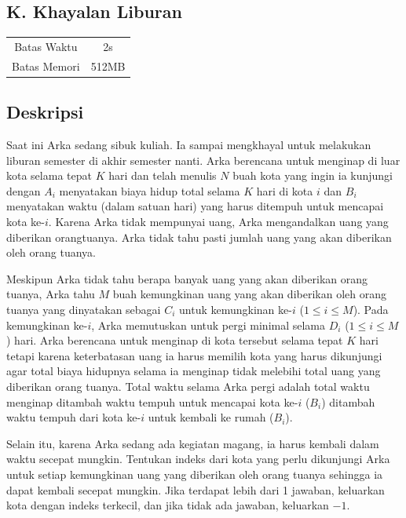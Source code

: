 \documentclass{article}
\begin{document}
\begin{center}
    \section*{K. Khayalan Liburan} %

    \begin{tabular}{ | c c | }
        \hline
        Batas Waktu  & 2s \\    %
        Batas Memori & 512MB \\  %
        \hline
    \end{tabular}
\end{center}

\subsection*{Deskripsi}
Saat ini Arka sedang sibuk kuliah. Ia sampai mengkhayal untuk melakukan liburan semester di akhir semester nanti. Arka berencana untuk menginap di luar kota selama tepat $K$ hari dan telah menulis $N$ buah kota yang ingin ia kunjungi dengan $A_i$  menyatakan biaya hidup total selama $K$ hari di kota $i$ dan $B_i$  menyatakan waktu (dalam satuan hari) yang harus ditempuh untuk mencapai kota ke-$i$. Karena Arka tidak mempunyai uang, Arka mengandalkan uang yang diberikan orangtuanya. Arka tidak tahu pasti jumlah uang yang akan diberikan oleh orang tuanya.

Meskipun Arka tidak tahu berapa banyak uang yang akan diberikan orang tuanya, Arka tahu $M$ buah kemungkinan uang yang akan diberikan oleh orang tuanya yang dinyatakan sebagai $C_i$ untuk kemungkinan ke-$i$ ($1 \leq i \leq M$). Pada kemungkinan ke-$i$, Arka memutuskan untuk pergi minimal selama $D_i$ ($1 \leq i \leq M$) hari. Arka berencana untuk menginap di kota tersebut selama tepat $K$ hari tetapi karena keterbatasan uang ia harus memilih kota yang harus dikunjungi agar total biaya hidupnya selama ia menginap tidak melebihi total uang yang diberikan orang tuanya. Total waktu selama Arka pergi adalah total waktu menginap ditambah waktu tempuh untuk mencapai kota ke-$i$ ($B_i$) ditambah waktu tempuh dari kota ke-$i$ untuk kembali ke rumah ($B_i$).

Selain itu, karena Arka sedang ada kegiatan magang, ia harus kembali dalam waktu secepat mungkin. Tentukan indeks dari kota yang perlu dikunjungi Arka untuk setiap kemungkinan uang yang diberikan oleh orang tuanya sehingga ia dapat kembali secepat mungkin. Jika terdapat lebih dari 1 jawaban, keluarkan kota dengan indeks terkecil, dan jika tidak ada jawaban, keluarkan $-1$.
\end{document}
